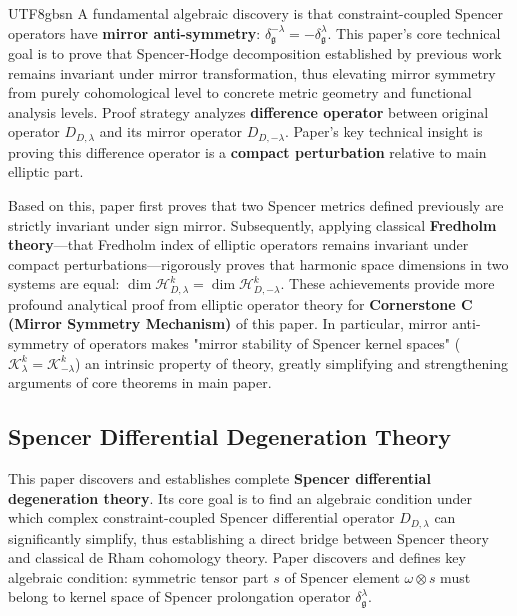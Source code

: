 \documentclass[a4paper,12pt]{extarticle}
\theoremstyle{definition}
\begin{document}
\begin{CJK}{UTF8}{gbsn}
A fundamental algebraic discovery is that constraint-coupled Spencer operators have \textbf{mirror anti-symmetry}: $\delta_{\mathfrak{g}}^{-\lambda} = -\delta_{\mathfrak{g}}^{\lambda}$. This paper's core technical goal is to prove that Spencer-Hodge decomposition established by previous work remains invariant under mirror transformation, thus elevating mirror symmetry from purely cohomological level to concrete metric geometry and functional analysis levels. Proof strategy analyzes \textbf{difference operator} between original operator $D_{D,\lambda}$ and its mirror operator $D_{D,-\lambda}$. Paper's key technical insight is proving this difference operator is a \textbf{compact perturbation} relative to main elliptic part.

Based on this, paper first proves that two Spencer metrics defined previously are strictly invariant under sign mirror. Subsequently, applying classical \textbf{Fredholm theory}—that Fredholm index of elliptic operators remains invariant under compact perturbations—rigorously proves that harmonic space dimensions in two systems are equal: $\dim \mathcal{H}_{D,\lambda}^k = \dim \mathcal{H}_{D,-\lambda}^k$. These achievements provide more profound analytical proof from elliptic operator theory for \textbf{Cornerstone C (Mirror Symmetry Mechanism)} of this paper. In particular, mirror anti-symmetry of operators makes "mirror stability of Spencer kernel spaces" ($\mathcal{K}_{\lambda}^k = \mathcal{K}_{-\lambda}^k$) an intrinsic property of theory, greatly simplifying and strengthening arguments of core theorems in main paper.

\subsection{Spencer Differential Degeneration Theory \cite{zheng2025spencerdifferentialdegenerationtheory}}
\label{subsec:roadmap_degeneration}
This paper \cite{zheng2025spencerdifferentialdegenerationtheory} discovers and establishes complete \textbf{Spencer differential degeneration theory}. Its core goal is to find an algebraic condition under which complex constraint-coupled Spencer differential operator $D_{D,\lambda}$ can significantly simplify, thus establishing a direct bridge between Spencer theory and classical de Rham cohomology theory. Paper discovers and defines key algebraic condition: symmetric tensor part $s$ of Spencer element $\omega \otimes s$ must belong to kernel space of Spencer prolongation operator $\delta_{\mathfrak{g}}^\lambda$.


\end{CJK}
\end{document}
